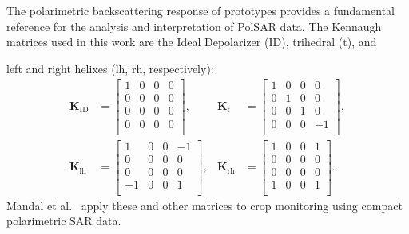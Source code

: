 \documentclass[journal]{IEEEtran}
\begin{document}
The polarimetric backscattering response of prototypes provides a fundamental reference for the analysis and interpretation of PolSAR data.
The Kennaugh matrices used in this work are the 
Ideal Depolarizer (${\text{ID}}$),
{trihedral} ($\text{t}$),
and {left and right helixes (${\text{lh}}$, ${\text{rh}}$, respectively):
\begin{align*}
\bm{K}_{\text{ID}} & =
\begin{bmatrix}
1 & 0 & 0 & 0\\
0 & 0 & 0 & 0\\
0 & 0 & 0 & 0\\
0 & 0 & 0 & 0\\
\end{bmatrix},
&
\bm K_{\text{t}} &=
\begin{bmatrix}
1 & 0 & 0 & 0\\
0 & 1 & 0 & 0\\
0 & 0 & 1 & 0\\
0 & 0 & 0 & -1\\
\end{bmatrix}, \\
\bm K_{\text{lh}} &= 
\begin{bmatrix}
1 & 0 & 0 & -1 \\
0 & 0 & 0 & 0 \\
0 & 0 & 0 & 0 \\
-1 & 0 & 0 & 1\\
\end{bmatrix}
,
& \bm K_{\text{rh}} &=
\begin{bmatrix}
1 & 0 & 0 & 1 \\
0 & 0 & 0 & 0 \\
0 & 0 & 0 & 0 \\
1 & 0 & 0 & 1\\
\end{bmatrix}.
\end{align*}
Mandal et al.~\cite{ARadarVegetationIndexforCropMonitoringUsingCompactPolarimetricSARData} apply these and other matrices to crop monitoring using compact polarimetric SAR data.

}
\end{document}
